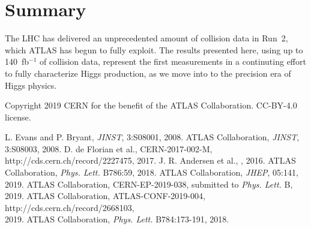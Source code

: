 \documentclass{moriond}
\begin{document}


\section{Summary}

The LHC has delivered an unprecedented amount of collision data in Run~2, which ATLAS has begun to
fully exploit. The results presented here, using up to 140~fb$^{-1}$ of collision data,
represent the first measurements in a continuting effort to fully characterize Higgs production,
as we move into to the precision era of Higgs physics.

\phantom{.}

\noindent
Copyright 2019 CERN for the benefit of the ATLAS Collaboration. CC-BY-4.0 license.

\begin{thebibliography}{99}
 L. Evans and P. Bryant, {\em JINST}, 3:S08001, 2008.
 ATLAS Collaboration, {\em JINST}, 3:S08003, 2008.
 D. de Florian et al., CERN-2017-002-M, http://cds.cern.ch/record/2227475, 2017.
 J. R. Andersen et al., \href{http://arxiv.org/abs/1605.04692}{\color{black}{arXiv:1605.04692}}, 2016.
 ATLAS Collaboration, {\em Phys. Lett.} B786:59, 2018.
 ATLAS Collaboration, {\em JHEP}, 05:141, 2019.
 ATLAS Collaboration, CERN-EP-2019-038, submitted to {\em Phys. Lett.} B, 2019.
 ATLAS Collaboration, ATLAS-CONF-2019-004, http://cds.cern.ch/record/2668103,\\ 2019.
 ATLAS Collaboration, {\em Phys. Lett.} B784:173-191, 2018.
\end{thebibliography}

%
\end{document}
